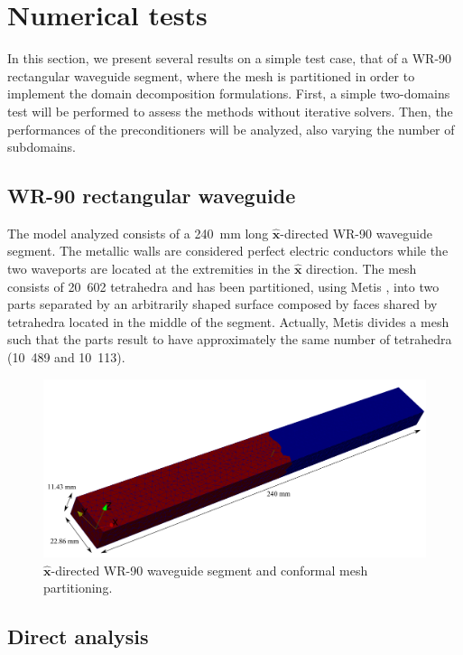 \section{Numerical tests}

In this section, we present several results on a simple test case, that of a WR-90 rectangular waveguide segment, where the mesh is partitioned in order to implement the domain decomposition formulations. First, a simple two-domains test will be performed to assess the methods without iterative solvers. Then, the performances of the preconditioners will be analyzed, also varying the number of subdomains. %

\subsection{WR-90 rectangular waveguide}

The model analyzed consists of a 240~mm long $\hat{\mathbf{x}}$-directed WR-90 waveguide segment. The metallic walls are considered perfect electric conductors  while the two waveports are located at the extremities in the $\hat{\mathbf{x}}$ direction. The mesh consists of 20~602 tetrahedra and has been partitioned, using Metis \cite{karypis1995metis}, into two parts separated by an arbitrarily shaped surface composed by faces shared by tetrahedra located in the middle of the segment. Actually, Metis divides a mesh such that the parts result to have approximately the same number of tetrahedra (10~489 and 10~113).

\begin{figure}[h!]
\centering
\includegraphics[width=13.4cm]{WR90Part}
\caption{$\hat{\mathbf{x}}$-directed WR-90 waveguide segment and conformal mesh partitioning.}
\label{fig:WR90Part}
\end{figure}

\subsection{Direct analysis}

